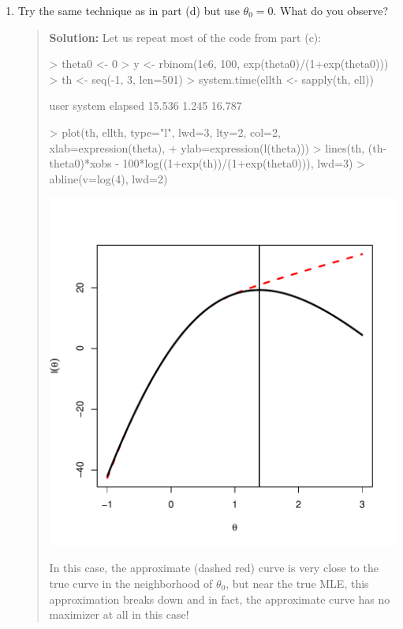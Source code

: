 \documentclass{article}
\begin{document}
\begin{enumerate}
\begin{enumerate}
      \item Try the same technique as in part (d) but use $\theta_0=0$. What do
      you observe?
      \begin{quotation}{\bf Solution:}
      Let us repeat most of the code from part (c):
\begin{Schunk}
\begin{Sinput}
> theta0 <- 0
> y <- rbinom(1e6, 100, exp(theta0)/(1+exp(theta0)))
> th <- seq(-1, 3, len=501)
> system.time(ellth <- sapply(th, ell))
\end{Sinput}
\begin{Soutput}
   user  system elapsed 
 15.536   1.245  16.787 
\end{Soutput}
\begin{Sinput}
> plot(th, ellth, type="l", lwd=3, lty=2, col=2, xlab=expression(theta),
+     ylab=expression(l(theta)))
> lines(th, (th-theta0)*xobs - 100*log((1+exp(th))/(1+exp(theta0))), lwd=3)
> abline(v=log(4), lwd=2)
\end{Sinput}
\end{Schunk}
\includegraphics{sol10-011}

      In this case, the approximate (dashed red) curve is very close to the true
      curve in the neighborhood of $\theta_0$, but near the true MLE, this
      approximation breaks down and in fact, the approximate curve has no 
      maximizer at all in this case!
      \end{quotation}
      
    \end{enumerate}

\end{enumerate}
\end{document}
